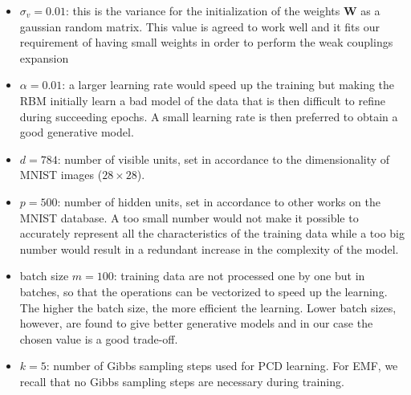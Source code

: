 \documentclass{revtex4-1}
\begin{document}
\begin{itemize}
  \item \(\sigma_v = 0.01\): this is the variance for the initialization of the weights \(\mathbf{W}\) as a gaussian random matrix. This value is agreed to work well and it fits our requirement of having small weights in order to perform the weak couplings expansion
  \item \(\alpha = 0.01\): a larger learning rate would speed up the training but making the RBM initially learn a bad model of the data that is then difficult to refine during succeeding epochs. A small learning rate is then preferred to obtain a good generative model.
  \item \(d = 784\): number of visible units, set in accordance to the dimensionality of MNIST images (\(28 \times 28\)).
  \item \(p = 500\): number of hidden units, set in accordance to other works on the MNIST database. A too small number would not make it possible to accurately represent all the characteristics of the training data while a too big number would result in a redundant increase in the complexity of the model.
  \item batch size \(m = 100\): training data are not processed one by one but in batches, so that the operations can be vectorized to speed up the learning. The higher the batch size, the more efficient the learning. Lower batch sizes, however, are found to give better generative models and in our case the chosen value is a good trade-off.
  \item \( k = 5 \): number of Gibbs sampling steps used for PCD learning. For EMF, we recall that no Gibbs sampling steps are necessary during training.
\end{itemize}
\end{document}
